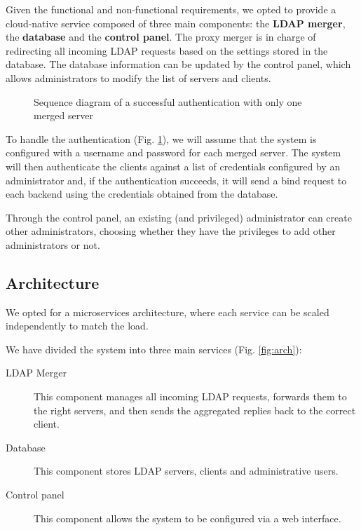 \documentclass{scrartcl}
\begin{document}
\par Given the functional and non-functional requirements, we opted to provide a cloud-native service composed of three main components: the \textbf{LDAP merger}, the \textbf{database} and the \textbf{control panel}. The proxy merger is in charge of redirecting all incoming LDAP requests based on the settings stored in the database. The database information can be updated by the control panel, which allows administrators to modify the list of servers and clients.
\begin{figure}[h]
    \centering
    
    \caption{Sequence diagram of a successful authentication with only one merged server}
    \label{fig:auth} 
\end{figure}
\par To handle the authentication (Fig. \ref{fig:auth}), we will assume that the system is configured with a username
and password for each merged server. The system will then authenticate the clients against a list of credentials configured
by an administrator and, if the authentication succeeds, it will send a bind request to each backend using the credentials
obtained from the database.
\par Through the control panel, an existing (and privileged) administrator can create other administrators, choosing whether
they have the privileges to add other administrators or not.

\subsection{Architecture}

\par We opted for a microservices architecture, where each service can be scaled independently to match the load.
\par We have divided the system into three main services (Fig. \ref{fig:arch}):
\begin{description}
    \item[LDAP Merger] This component manages all incoming LDAP requests, forwards them to the right servers, and then sends the aggregated replies back to the correct client.
    \item[Database] This component stores LDAP servers, clients and administrative users.
    \item[Control panel] This component allows the system to be configured via a web interface.
\end{description}
\end{document}
